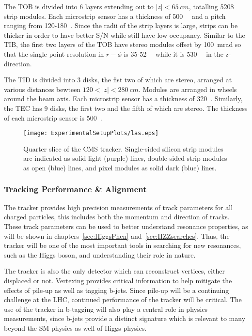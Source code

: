 The TOB is divided into 6 layers extending out to $|z|<65~cm$, totalling
5208 strip modules.  Each microstrip sensor has a thickness of 500~\microns~
and a pitch ranging from 120-180~\microns.  Since the radii of the strip
layers is large, strips can be thicker in order to have better S/N while 
still have low occupancy.  Similar to the TIB, the first two layers of the
TOB have stereo modules offset by 100~mrad so that the single point resolution
in $r-\phi$ is 35-52~\microns~ while it is 530~\microns~ in the z-direction.

The TID is divided into 3 disks, the fist two of which are stereo, arranged
at various distances bewteen $120<|z|<280~cm$.  Modules
are arranged in wheels around the beam axis.  Each microstrip sensor has a 
thickness of 320~\microns.  Similarly, the TEC has 9 disks, the first two and 
the fifth of which are stereo.  The thickness of each microstrip sensor
is 500~\microns. 

\begin{figure}
\begin{center}
\hspace{-2.5cm}
\texttt{[image: ExperimentalSetupPlots/las.eps]}
\caption{Quarter slice of the CMS tracker.  Single-sided silicon strip modules
are indicated as solid light (purple) lines, double-sided strip modules as 
open (blue) lines, and pixel modules as solid dark (blue) lines.}
\label{fig:TrackerGeometry}
\end{center}
\end{figure}

\subsubsection{Tracking Performance \& Alignment}

The tracker provides high precision measurements of track parameters for
all charged particles, this includes both the momentum and direction
of tracks.  These track parameters can be used to 
better understand resonance properties, as will be shown in 
chapters~\ref{sec:HiggsPhen} and~\ref{sec:HZZsearches}.  Thus, the 
tracker will be one of the most important tools in searching for new 
resonances, such as the Higgs boson, and understanding their role in
nature.  

The tracker is also the only detector which can reconstruct vertices, either
displaced or not.  Vertexing provides critical information to help mitigate
the effects of pile-up as well as tagging b-jets.  Since pile-up will be
a continuing challenge at the LHC, continued performance of the tracker
will be critical.  The use of the tracker in b-tagging will also play 
a central role in physics measurements, since b-jets provide a distinct 
signature which is relevant to many beyond the SM physics as well of Higgs
physics.  


